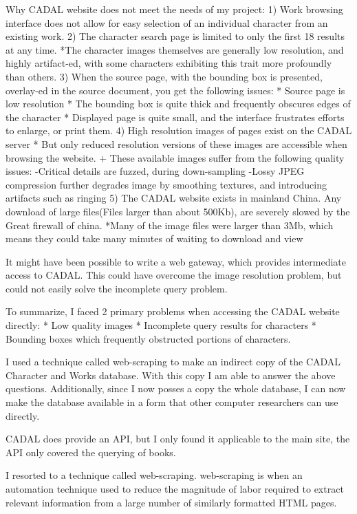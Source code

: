     Why CADAL website does not meet the needs of my project:
        1)  Work browsing interface does not allow for easy selection of an individual character from an existing work.
        2)  The character search page is limited to only the first 18 results at any time.
            *The character images themselves are generally low resolution, and highly artifact-ed, with some characters exhibiting this trait more profoundly than others.
        3)  When the source page, with the bounding box is presented, overlay-ed in the source document, you get the following issues:
            *  Source page is low resolution
            *  The bounding box is quite thick and frequently obscures edges of the character
            *  Displayed page is quite small, and the interface frustrates efforts to enlarge, or print them.
        4)  High resolution images of pages exist on the CADAL server
            * But only reduced resolution versions of these images are accessible when browsing the website.
                + These available images suffer from the following quality issues:
                    -Critical details are fuzzed, during down-sampling
                    -Lossy JPEG compression further degrades image by smoothing textures, and introducing artifacts such as ringing
        5)  The CADAL website exists in mainland China.  Any download of large files(Files larger than about 500Kb), are severely slowed by the Great firewall of china.
            *Many of the image files were larger than 3Mb, which means they could take many minutes of waiting to download and view
        
        
    It might have been possible to write a web gateway, which provides intermediate access to CADAL.  This could have overcome the image resolution problem, but could not easily solve the incomplete query problem.
    
    To summarize, I faced 2 primary problems when accessing the CADAL website directly:
        *  Low quality images
        *  Incomplete query results for characters
        *  Bounding boxes which frequently obstructed portions of characters.
                    

I used a technique called web-scraping to make an indirect copy of the CADAL Character and Works database.  With this copy I am able to answer the above questions.  Additionally, since I now posses a copy the whole database, I can now make the database available in a form that other computer researchers can use directly.


    CADAL does provide an API, but I only found it applicable to the main site, the API only covered the querying of books.



   I resorted to a technique called web-scraping.  web-scraping is when an automation technique used to reduce the magnitude of labor required to extract relevant information from a large number of similarly formatted HTML pages.






